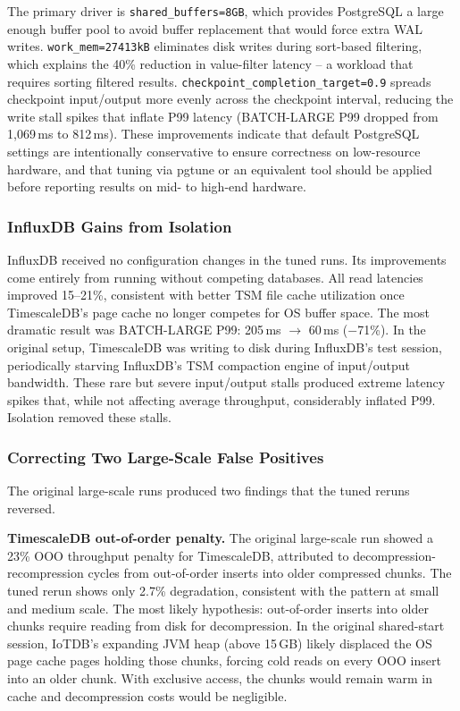 The primary driver is \texttt{shared\_buffers=8GB}, which provides PostgreSQL a large
enough buffer pool to avoid buffer replacement that would force extra WAL writes.
\texttt{work\_mem=27413kB} eliminates disk writes during sort-based filtering, which explains the 40\% reduction in value-filter latency -- a workload that requires sorting filtered results.
\texttt{checkpoint\_completion\_target=0.9} spreads checkpoint input/output more
evenly across the checkpoint interval, reducing the write stall spikes that inflate P99
latency (BATCH-LARGE P99 dropped from 1{,}069\,ms to 812\,ms). These improvements
indicate that default PostgreSQL settings are intentionally conservative to ensure
correctness on low-resource hardware, and that tuning via pgtune or an equivalent tool
should be applied before reporting results on mid- to high-end hardware.

\subsubsection{InfluxDB Gains from Isolation}

InfluxDB received no configuration changes in the tuned runs. Its improvements come entirely
from running without competing databases. All read latencies improved 15--21\%, consistent
with better TSM file cache utilization once TimescaleDB's page cache no longer competes for
OS buffer space. The most dramatic result was BATCH-LARGE P99: 205\,ms $\to$ 60\,ms
($-$71\%). In the original setup, TimescaleDB was writing to disk during
InfluxDB's test session, periodically starving InfluxDB's TSM compaction engine of input/output
bandwidth. These rare but severe input/output stalls produced extreme latency spikes that, while not
affecting average throughput, considerably inflated P99. Isolation removed these stalls.

\subsubsection{Correcting Two Large-Scale False Positives}

The original large-scale runs produced two findings that the tuned reruns reversed.

\textbf{TimescaleDB out-of-order penalty.} The original large-scale run showed a 23\%
OOO throughput penalty for TimescaleDB, attributed to decompression-recompression cycles
from out-of-order inserts into older compressed chunks. The tuned rerun shows only 2.7\%
degradation, consistent with the pattern at small and medium scale. The most likely hypothesis: out-of-order inserts into older chunks require reading
from disk for decompression. In the original shared-start session, IoTDB's expanding JVM heap (above
15\,GB) likely displaced the OS page cache pages holding those chunks, forcing cold reads
on every OOO insert into an older chunk. With exclusive access, the chunks would
remain warm in cache and decompression costs would be negligible.

